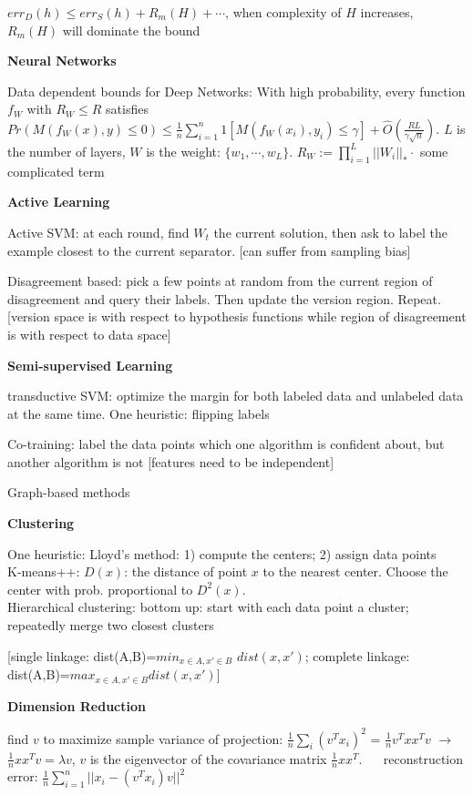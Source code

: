 \documentclass{article}
\begin{document}
$err_D(h) \leq err_S(h) + R_m(H) + \cdots$, when complexity of $H$ increases, $R_m(H)$ will dominate the bound

\noindent
\textbf{Neural Networks}

Data dependent bounds for Deep Networks: With high probability, every function $f_W$ with $R_W \leq R$ satisfies $Pr(M(f_W(x), y) \leq 0) \leq \frac{1}{n}\sum_{i=1}^n 1[M(f_W(x_i), y_i) \leq \gamma] + \hat{O}(\frac{RL}{\gamma \sqrt{n}})$. $L$ is the number of layers, $W$ is the weight: $\{w_1, \cdots, w_L\}$. $R_W:= \prod_{i=1}^L ||W_i||_{*} \cdot$ some complicated term

\noindent
\textbf{Active Learning}

Active SVM: at each round, find $W_t$ the current solution, then ask to label the example closest to the current separator. [can suffer from sampling bias]

Disagreement based: pick a few points at random from the current region of disagreement and query their labels. Then update the version region. Repeat.
[version space is with respect to hypothesis functions while region of disagreement is with respect to data space]

\noindent
\textbf{Semi-supervised Learning}

transductive SVM: optimize the margin for both labeled data and unlabeled data at the same time. One heuristic: flipping labels 

Co-training: label the data points which one algorithm is confident about, but another algorithm is not [features need to be independent]

Graph-based methods

\noindent
\textbf{Clustering}

One heuristic: Lloyd's method: 1) compute the centers; 2) assign data points \\
K-means++: $D(x)$: the distance of point $x$ to the nearest center. Choose the center with prob. proportional to $D^2(x)$. \\
Hierarchical clustering: bottom up: start with each data point a cluster; repeatedly merge two closest clusters 

[single linkage: dist(A,B)=$min_{x \in A, x' \in B}$ $dist(x,x')$; complete linkage: dist(A,B)=$max_{x \in A, x' \in B} dist(x,x')$]

\noindent
\textbf{Dimension Reduction}

find $v$ to maximize sample variance of projection: $\frac{1}{n}\sum_i (v^{T}x_i)^2$ = $\frac{1}{n} v^{T}xx^{T}v$ $\rightarrow$ $\frac{1}{n}xx^{T}v = \lambda v$, $v$ is the eigenvector of the covariance matrix $\frac{1}{n}xx^{T}$. ~~ reconstruction error: $\frac{1}{n} \sum_{i=1}^{n} || x_i - (v^{T}x_i)v||^2$
\end{document}
